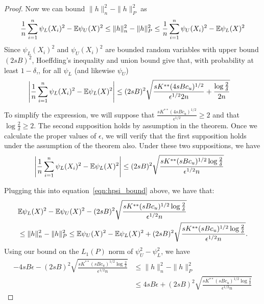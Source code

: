 \begin{proof}
Now we can bound $\| h \|_n^2 - \| h \|_P^2$ as
\begin{align}
\frac{1}{n} \sum_{i=1}^n \psi_L(X_i)^2 - {\mathbb E} \psi_U(X)^2  \leq
    \| h \|_n^2 - \| h \|_P^2 \leq
  \frac{1}{n} \sum_{i=1}^n \psi_U(X_i)^2 - {\mathbb E} \psi_L(X)^2  \label{eqn:hpsi_bound}
\end{align}
Since 
$\psi_L(X_i)^2$ and $\psi_U(X_i)^2$ are bounded random variables with
upper bound $(2sB)^2$, Hoeffding's inequality and union bound give that,
with probability at least $1-\delta$,, for all $\psi_L$ (and likewise $\psi_U$)
\begin{align*}
\left| \frac{1}{n} \sum_{i=1}^n \psi_L(X_i)^2 - 
   {\mathbb E} \psi_L(X)^2 \right| &\leq (2sB)^2 \sqrt{ \frac{sK^{**} (4sBc_u)^{1/2}}{\epsilon^{1/2}2n} + \frac{\log\frac{2}{\delta}}{2n}} 
\end{align*}
To simplify the expression, we will suppose that $\frac{sK^{**} (4sBc_u)^{1/2}}{\epsilon^{1/2}} \geq 2$ and that $\log \frac{2}{\delta} \geq 2$. The second supposition holds by assumption in the theorem. Once we calculate the proper values of $\epsilon$, we will verify that the first supposition holds under the assumption of the theorem also. Under these two suppositions, we have
\begin{align}
\label{eqn:simplified_psi_concentration}
\left| \frac{1}{n} \sum_{i=1}^n \psi_L(X_i)^2 - 
   {\mathbb E} \psi_L(X)^2 \right| &\leq (2sB)^2 \sqrt{ \frac{ sK^{**} (sBc_u)^{1/2} \log \frac{2}{\delta}}{ \epsilon^{1/2} n} }
\end{align}

Plugging this into equation~\eqref{eqn:hpsi_bound} above, we have that:
\begin{align*}
& {\mathbb E} \psi_L(X)^2 - {\mathbb E} \psi_U(X)^2 - 
(2sB)^2 \sqrt{ \frac{ sK^{**} (sBc_u)^{1/2} \log \frac{2}{\delta}}{ \epsilon^{1/2} n} } \\
 & \leq 
 \| h \|_n^2 - \| h \|_P^2 \leq
{\mathbb E} \psi_U(X)^2 - {\mathbb E} \psi_L(X)^2 + 
(2sB)^2 \sqrt{ \frac{ sK^{**} (sBc_u)^{1/2} \log \frac{2}{\delta}}{ \epsilon^{1/2} n} }.
\end{align*}
Using our bound on the $L_1(P)$ norm of $\psi_U^2 - \psi_L^2$, we have
\begin{align*}
-4sB\epsilon - 
(2sB)^2 \sqrt{ \frac{ sK^{**} (sBc_u)^{1/2} \log \frac{2}{\delta}}{ \epsilon^{1/2} n} } &\leq 
 \| h \|_n^2 - \| h \|_P^2 \\
& \leq 4sB\epsilon + 
(2sB)^2 \sqrt{ \frac{ sK^{**} (sBc_u)^{1/2} \log \frac{2}{\delta}}{ \epsilon^{1/2} n} }
\end{align*}


\end{proof}
